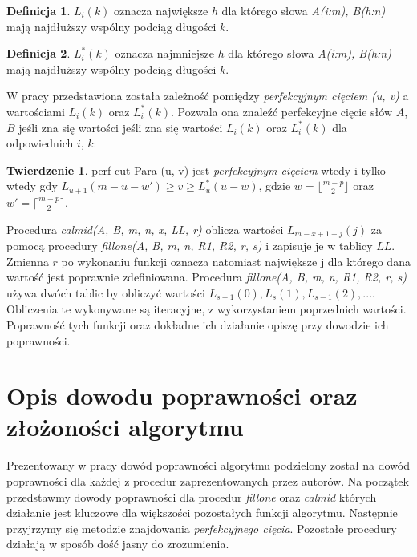 \documentclass[12pt]{article}
\theoremstyle{definition}
\newtheorem{definition}{Definicja}[section]
\theoremstyle{definition}
\newtheorem{theorem}{Twierdzenie}[section]
\theoremstyle{definition}
\begin{document}
\begin{definition}{}
$L_i(k)$ oznacza największe $h$ dla którego słowa \textit{A(i:m), B(h:n)} mają najdłuższy wspólny podciąg długości $k$.
\end{definition}

\begin{definition}
$L_i^*(k)$ oznacza najmniejsze $h$ dla którego słowa \textit{A(i:m), B(h:n)} mają najdłuższy wspólny podciąg długości $k$.
\end{definition}

\noindent W pracy przedstawiona została zależność pomiędzy \textit{perfekcyjnym cięciem (u, v)} a wartościami $L_i(k)$ oraz $L_i^*(k)$. Pozwala ona znaleźć perfekcyjne cięcie słów $A$, $B$ jeśli zna się wartości jeśli zna się wartości $L_i(k)$ oraz $L_i^*(k)$ dla odpowiednich $i$, $k$:

\begin{theorem}{}{perf-cut}
Para (u, v) jest \textit{perfekcyjnym cięciem} wtedy i tylko wtedy gdy $L_{u+1}(m - u - w') \geq v \geq L^*_u(u - w)$, gdzie $w = \lfloor\frac{m-p}{2}\rfloor$ oraz $w' = \lceil\frac{m-p}{2}\rceil$.
\end{theorem}

Procedura \textit{calmid(A, B, m, n, x, LL, r)} oblicza wartości $L_{m-x+1-j}(j)$ za pomocą procedury \textit{fillone(A, B, m, n, R1, R2, r, s)} i zapisuje je w tablicy $LL$. Zmienna $r$ po wykonaniu funkcji oznacza natomiast największe j dla którego dana wartość jest poprawnie zdefiniowana. Procedura \textit{fillone(A, B, m, n, R1, R2, r, s)} używa dwóch tablic by obliczyć wartości $L_{s+1}(0), L_s(1), L_{s-1}(2), ...$. Obliczenia te wykonywane są iteracyjne, z wykorzystaniem poprzednich wartości. Poprawność tych funkcji oraz dokładne ich działanie opiszę przy dowodzie ich poprawności.


\section{Opis dowodu poprawności oraz złożoności algorytmu}
Prezentowany w pracy dowód poprawności algorytmu podzielony został na dowód poprawności dla każdej z procedur zaprezentowanych przez autorów. Na początek przedstawmy dowody poprawności dla procedur \textit{fillone} oraz \textit{calmid} których działanie jest kluczowe dla większości pozostałych funkcji algorytmu. Następnie przyjrzymy się metodzie znajdowania \textit{perfekcyjnego cięcia}. Pozostałe procedury działają w sposób dość jasny do zrozumienia.
\end{document}
